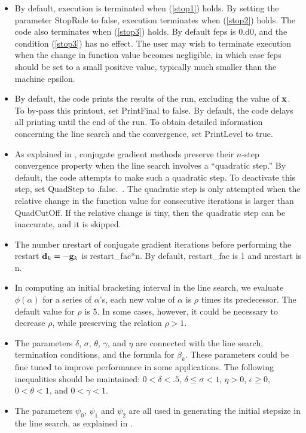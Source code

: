 \documentclass [12pt] {article}
\newcommand{\m}[1]{{\bf{#1}}}
\begin{document}
\begin{itemize}
\item
By default, execution is terminated when (\ref{stop1}) holds.
By setting the parameter {\sc StopRule} to false,
execution terminates when (\ref{stop2}) holds.
The code also terminates when (\ref{stop3}) holds.
By default {\sc feps} is 0.d0, and the condition (\ref{stop3}) has no effect.
The user may wish to terminate execution when
the change in function value becomes negligible, in which case {\sc feps}
should be set to a small positive value, typically much
smaller than the machine epsilon.
\item
By default, the code prints the results of the run, excluding the value
of $\m{x}$.
To by-pass this printout, set {\sc PrintFinal} to false.
By default, the code delays all printing until the end of the run.
To obtain detailed information concerning the line search and the convergence,
set {\sc PrintLevel} to true.
\item
As explained in \cite{hz2}, conjugate gradient methods preserve their $n$-step
convergence property when the line search involves a ``quadratic step.''
By default, the code attempts to make such a quadratic step.
To deactivate this step, set {\sc QuadStep} to .false.~.
The quadratic step is only attempted when the relative change in the
function value for consecutive iterations is larger than {\sc QuadCutOff}.
If the relative change is tiny, then the quadratic step can be inaccurate,
and it is skipped.
\item
The number {\sc nrestart} of conjugate gradient iterations before
performing the restart
$\m{d}_k = - \m{g}_k$ is
{\sc restart\_fac}*{\sc n}.
By default, {\sc restart\_fac} is 1 and {\sc nrestart} is {\sc n}.
\item
In computing an initial bracketing interval in the line search,
we evaluate $\phi (\alpha)$ for a series of $\alpha$'s, each new value
of $\alpha$ is $\rho$ times its predecessor.
The default value for $\rho$ is 5.
In some cases, however,
it could be necessary to decrease $\rho$, while
preserving the relation $\rho > 1$.
\item
The parameters $\delta$, $\sigma$, $\theta$, $\gamma$, and $\eta$
are connected with the line search, termination
conditions, and the formula for $\beta_k$.
These parameters could be fine tuned to improve performance in some
applications.
The following inequalities should be maintained:
$0 < \delta < .5$, $\delta \le \sigma < 1$, $\eta > 0$, $\epsilon \ge 0$,
$0 < \theta < 1$, and $0 < \gamma < 1$.
\item
The parameters $\psi_0$, $\psi_1$ and $\psi_2$ are all used
in generating the initial stepsize in the line search,
as explained in \cite{hz2}.
\end{itemize}
\end{document}

